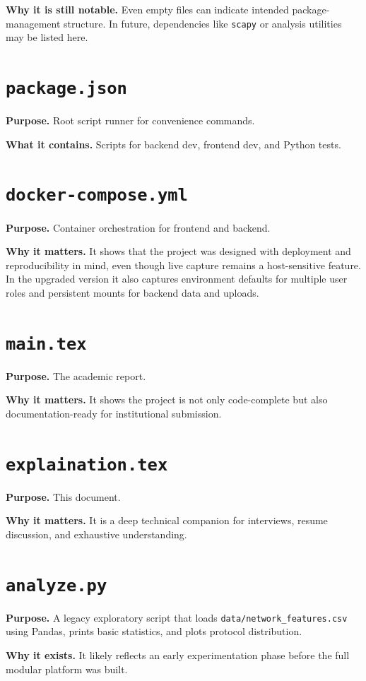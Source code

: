 \documentclass[12pt,a4paper]{report}
\begin{document}
\textbf{Why it is still notable.} Even empty files can indicate intended package-management structure. In future, dependencies like \texttt{scapy} or analysis utilities may be listed here.

\section{\texttt{package.json}}
\textbf{Purpose.} Root script runner for convenience commands.

\textbf{What it contains.} Scripts for backend dev, frontend dev, and Python tests.

\section{\texttt{docker-compose.yml}}
\textbf{Purpose.} Container orchestration for frontend and backend.

\textbf{Why it matters.} It shows that the project was designed with deployment and reproducibility in mind, even though live capture remains a host-sensitive feature. In the upgraded version it also captures environment defaults for multiple user roles and persistent mounts for backend data and uploads.

\section{\texttt{main.tex}}
\textbf{Purpose.} The academic report.

\textbf{Why it matters.} It shows the project is not only code-complete but also documentation-ready for institutional submission.

\section{\texttt{explaination.tex}}
\textbf{Purpose.} This document.

\textbf{Why it matters.} It is a deep technical companion for interviews, resume discussion, and exhaustive understanding.

\section{\texttt{analyze.py}}
\textbf{Purpose.} A legacy exploratory script that loads \texttt{data/network\_features.csv} using Pandas, prints basic statistics, and plots protocol distribution.

\textbf{Why it exists.} It likely reflects an early experimentation phase before the full modular platform was built.
\end{document}
